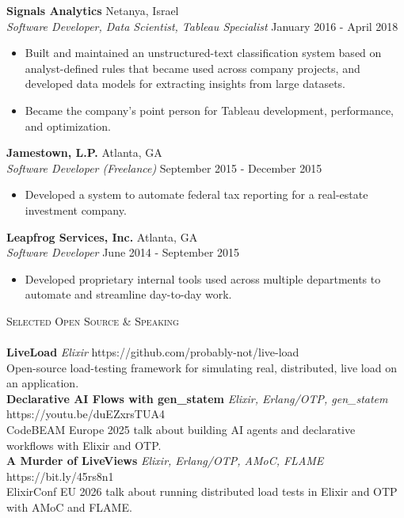 \documentclass[a4paper]{article}
\newcommand{\lineunder} {
    \vspace*{-8pt} \\
    \hspace*{-18pt} \hrulefill \\
}
\newcommand{\header} [1] {
    {\hspace*{-18pt}\vspace*{6pt} \textsc{#1}}
    \vspace*{-6pt} \lineunder
}
\begin{document}
\textbf{Signals Analytics} \hfill Netanya, Israel\\
\textit{Software Developer, Data Scientist, Tableau Specialist} \hfill January 2016 - April 2018\\
\vspace{-1mm}
\begin{itemize} \itemsep 1pt
	\item Built and maintained an unstructured-text classification system based on analyst-defined rules that became used across company projects, and developed data models for extracting insights from large datasets.
	\item Became the company's point person for Tableau development, performance, and optimization.
\end{itemize}
\textbf{Jamestown, L.P.} \hfill Atlanta, GA\\
\textit{Software Developer (Freelance)} \hfill September 2015 - December 2015\\
\vspace{-1mm}
\begin{itemize} \itemsep 1pt
	\item Developed a system to automate federal tax reporting for a real-estate investment company.
\end{itemize}
\textbf{Leapfrog Services, Inc.} \hfill Atlanta, GA\\
\textit{Software Developer} \hfill June 2014 - September 2015\\
\vspace{-1mm}
\begin{itemize} \itemsep 1pt
	\item Developed proprietary internal tools used across multiple departments to automate and streamline day-to-day work.
\end{itemize}

\header{Selected Open Source \& Speaking}
{\textbf{LiveLoad}} {\sl Elixir} \hfill https://github.com/probably-not/live-load\\
Open-source load-testing framework for simulating real, distributed, live load on an application.\\
\vspace*{2mm}
{\textbf{Declarative AI Flows with gen\_statem}} {\sl Elixir, Erlang/OTP, gen\_statem} \hfill https://youtu.be/duEZxrsTUA4\\
CodeBEAM Europe 2025 talk about building AI agents and declarative workflows with Elixir and OTP.\\
\vspace*{2mm}
{\textbf{A Murder of LiveViews}} {\sl Elixir, Erlang/OTP, AMoC, FLAME} \hfill https://bit.ly/45rs8n1\\
ElixirConf EU 2026 talk about running distributed load tests in Elixir and OTP with AMoC and FLAME.\\
\vspace{1mm}
\end{document}
